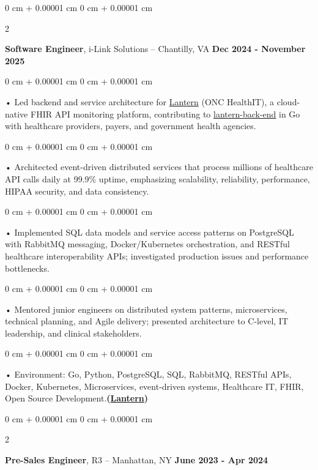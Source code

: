 \documentclass[10pt, letterpaper]{article}
\newenvironment{onecolentry}{
    \begin{adjustwidth}{
        0 cm + 0.00001 cm
    }{
        0 cm + 0.00001 cm
    }
}{
    \end{adjustwidth}
} %
\newenvironment{twocolentry}[2][]{
    \onecolentry
    \def\secondColumn{#2}
    \setcolumnwidth{\fill, 4.5 cm}
    \begin{paracol}{2}
}{
    \switchcolumn \raggedleft \secondColumn
    \end{paracol}
    \endonecolentry
} %
\begin{document}
        \vspace{0.1cm}

        \begin{twocolentry}{
            \textbf{Dec 2024 - November 2025}
        }
            \textbf{Software Engineer}, i-Link Solutions -- Chantilly, VA\end{twocolentry}


        \begin{onecolentry}
             • Led backend and service architecture for \href{https://lantern.healthit.gov/?tab=dashboard_tab}{Lantern} (ONC HealthIT), a cloud-native FHIR API monitoring platform, contributing to \href{https://github.com/onc-healthit/lantern-back-end}{lantern-back-end} in Go with healthcare providers, payers, and government health agencies.
        \end{onecolentry}
        \begin{onecolentry}
             • Architected event-driven distributed services that process millions of healthcare API calls daily at 99.9\% uptime, emphasizing scalability, reliability, performance, HIPAA security, and data consistency.
        \end{onecolentry}
        \begin{onecolentry}
             • Implemented SQL data models and service access patterns on PostgreSQL with RabbitMQ messaging, Docker/Kubernetes orchestration, and RESTful healthcare interoperability APIs; investigated production issues and performance bottlenecks.
        \end{onecolentry}
        \begin{onecolentry}
             • Mentored junior engineers on distributed system patterns, microservices, technical planning, and Agile delivery; presented architecture to C-level, IT leadership, and clinical stakeholders.
        \end{onecolentry}
        \begin{onecolentry}
             • Environment: Go, Python, PostgreSQL, SQL, RabbitMQ, RESTful APIs, Docker, Kubernetes, Microservices, event-driven systems, Healthcare IT, FHIR, Open Source Development.\textbf{(\href{https://lantern.healthit.gov/?tab=dashboard_tab}{Lantern})}
        \end{onecolentry}
        \vspace{0.1cm}

        \begin{twocolentry}{
            \textbf{June 2023 - Apr 2024}
        }
            \textbf{Pre-Sales Engineer}, R3 -- Manhattan, NY\end{twocolentry}
\end{document}
